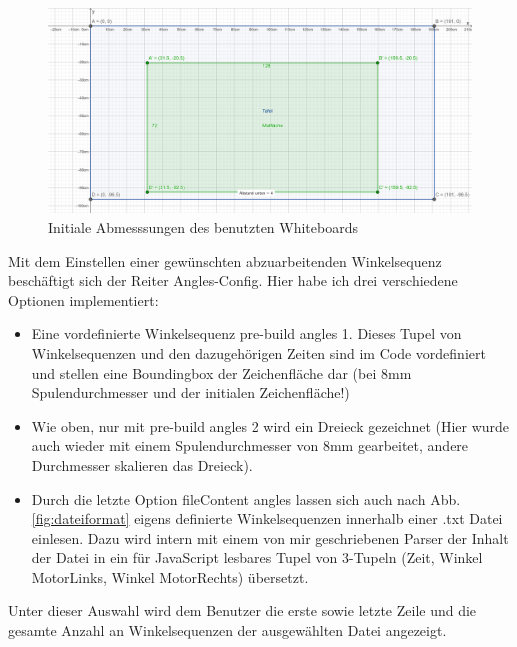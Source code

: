 \begin{figure}[ht]\centering
\includegraphics[width=\linewidth]{images/Tafelabmessungen.png}
\caption{Initiale Abmesssungen des benutzten Whiteboards}
\label{fig:abmessungen}
\end{figure}

Mit dem Einstellen einer gewünschten abzuarbeitenden Winkelsequenz beschäftigt sich der Reiter \glqq{}Angles-Config\grqq{}. Hier habe ich drei verschiedene Optionen implementiert: 

\begin{itemize}
\item Eine vordefinierte Winkelsequenz \glqq{}pre-build angles 1\grqq{}. Dieses Tupel von Winkelsequenzen und den dazugehörigen Zeiten sind im Code vordefiniert und stellen eine Boundingbox der Zeichenfläche dar (bei 8mm Spulendurchmesser und der initialen Zeichenfläche!) 
\item Wie oben, nur mit \glqq{}pre-build angles 2\grqq{} wird ein Dreieck gezeichnet (Hier wurde auch wieder mit einem Spulendurchmesser von 8mm gearbeitet, andere Durchmesser skalieren das Dreieck). 
\item Durch die letzte Option \glqq{}fileContent angles\grqq{} lassen sich auch nach Abb. \ref{fig:dateiformat} eigens definierte Winkelsequenzen innerhalb einer .txt Datei einlesen. Dazu wird intern mit einem von mir geschriebenen Parser der Inhalt der Datei in ein für JavaScript lesbares Tupel von 3-Tupeln (Zeit, Winkel MotorLinks, Winkel MotorRechts) übersetzt.  
\end{itemize}

Unter dieser Auswahl wird dem Benutzer die erste sowie letzte Zeile und die gesamte Anzahl an Winkelsequenzen der ausgewählten Datei angezeigt.

